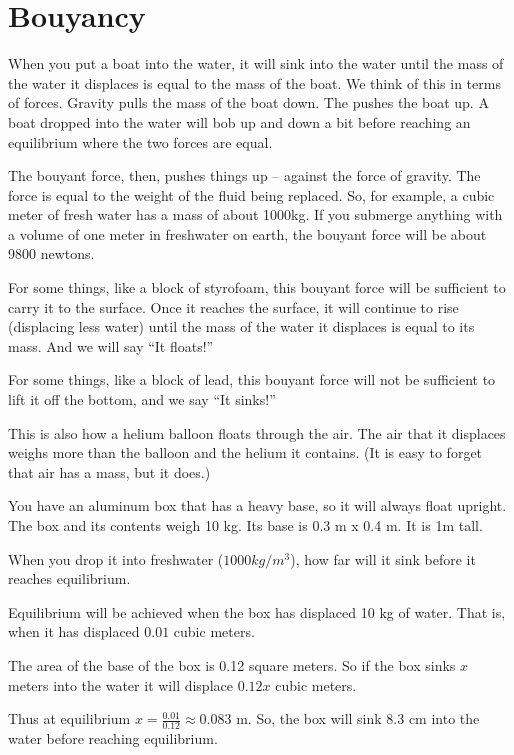 \chapter{Bouyancy}

When you put a boat into the water, it will sink into the water until
the mass of the water it displaces is equal to the mass of the
boat. We think of this in terms of forces.  Gravity pulls the mass of
the boat down. The  pushes the boat up. A boat
dropped into the water will bob up and down a bit before reaching an
equilibrium where the two forces are equal.

The bouyant force, then, pushes things up -- against the force of
gravity. The force is equal to the weight of the fluid being
replaced. So, for example, a cubic meter of fresh water has a mass of
about 1000kg.  If you submerge anything with a volume of one meter in
freshwater on earth, the bouyant force will be about 9800 newtons.

For some things, like a block of styrofoam, this bouyant force will be
sufficient to carry it to the surface. Once it reaches the surface, it
will continue to rise (displacing less water) until the mass of the
water it displaces is equal to its mass. And we will say ``It floats!''

For some things, like a block of lead, this bouyant force will not
be sufficient to lift it off the bottom, and we say ``It sinks!''

This is also how a helium balloon floats through the air.  The air
that it displaces weighs more than the balloon and the helium it
contains. (It is easy to forget that air has a mass, but it does.)

\begin{Exercise}[title={Bouyancy}, label=bouyancy]
  You have an aluminum box that has a heavy base, so it will always
  float upright. The box and its contents weigh 10 kg. Its base is 0.3 m x 0.4 m. It is 1m tall.

  When you drop it into freshwater ($1000 kg/m^3$), how far will it sink
  before it reaches equilibrium.
  
\end{Exercise}
\begin{Answer}[ref=bouyancy]
  Equilibrium will be achieved when the box has displaced 10 kg of water. That is, when it has displaced $0.01$ cubic meters.

  The area of the base of the box is 0.12 square meters.  So if the
  box sinks $x$ meters into the water it will displace $0.12 x$ cubic
  meters.

  Thus at equilibrium $x = \frac{0.01}{0.12} \approx 0.083$ m.  So,
  the box will sink 8.3 cm into the water before reaching equilibrium.
\end{Answer}

